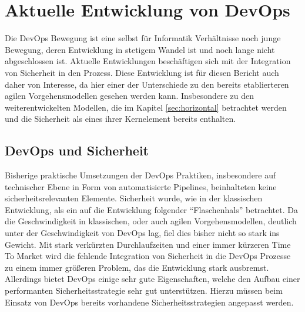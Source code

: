 \section{Aktuelle Entwicklung von DevOps} %
Die DevOps Bewegung ist eine selbst für Informatik Verhältnisse noch junge Bewegung, deren Entwicklung in stetigem Wandel ist und noch lange nicht abgeschlossen ist. 
Aktuelle Entwicklungen beschäftigen sich mit der Integration von Sicherheit in den Prozess. 
Diese Entwicklung ist für diesen Bericht auch daher von Interesse, da hier einer der Unterschiede zu den bereits etablierteren agilen Vorgehensmodellen gesehen werden kann. 
Insbesondere zu den weiterentwickelten Modellen, die im Kapitel \autoref{sec:horizontal} betrachtet werden und die Sicherheit als eines ihrer Kernelement bereits enthalten.

\subsection{DevOps und Sicherheit}
Bisherige praktische Umsetzungen der DevOps Praktiken, insbesondere auf technischer Ebene in Form von automatisierte Pipelines, beinhalteten keine sicherheitsrelevanten Elemente. 
Sicherheit wurde, wie in der klassischen Entwicklung, als ein auf die Entwicklung folgender \enquote{Flaschenhals} betrachtet. 
Da die Geschwindigkeit in klassischen, oder auch agilen Vorgehensmodellen, deutlich unter der Geschwindigkeit von DevOps lag, fiel dies bisher nicht so stark ins Gewicht. 
Mit stark verkürzten Durchlaufzeiten und einer immer kürzeren Time To Market wird die fehlende Integration von Sicherheit in die DevOps Prozesse zu einem immer größeren Problem, das die Entwicklung stark ausbremst. 
Allerdings bietet DevOps einige sehr gute Eigenschaften, welche den Aufbau einer performanten Sicherheitsstrategie sehr gut unterstützen. 
Hierzu müssen beim Einsatz von DevOps bereits vorhandene Sicherheitsstrategien angepasst werden.

